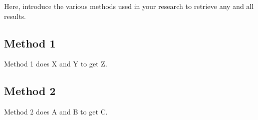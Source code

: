 \documentclass[main.tex]{subfiles}
\begin{document}
	Here, introduce the various methods used in your research to retrieve
	any and all results.
	
	\subsection{Method 1}  
	Method 1 does X and Y to get Z.
	
	\subsection{Method 2}
	Method 2 does A and B to get C.
\end{document}
